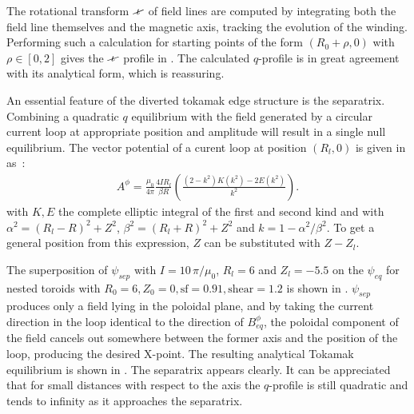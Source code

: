 The rotational transform $\iotaslash$ of field lines are computed by integrating both the field line themselves and the magnetic axis, tracking the evolution of the winding. Performing such a calculation for starting points of the form $(R_0+\rho,0)$ with $\rho\in [0, 2]$ gives the $\iotaslash$ profile in . The calculated $q$-profile is in great agreement with its analytical form, which is reassuring.

An essential feature of the diverted tokamak edge structure is the separatrix. Combining a quadratic $q$ equilibrium with the field generated by a circular current loop at appropriate position and amplitude will result in a single null equilibrium. The vector potential of a curent loop at position $(R_l, 0)$ is given in \cite{simpson_simple_2001} as~:
\begin{align*}
    A^\phi = \frac{\mu_0}{4\pi}\frac{4IR_l}{\beta R}\left(\frac{(2-k^2)K(k^2)-2E(k^2)}{k^2}\right).
\end{align*}
with $K, E$ the complete elliptic integral of the first and second kind and with $\alpha^2 = (R_l-R)^2 + Z^2$, $\beta^2 = (R_l+R)^2+Z^2$ and $k = 1 - \alpha^2/\beta^2$. To get a general position from this expression, $Z$ can be substituted  with $Z-Z_l$.

The superposition of $\psi_{sep}$ with $I = 10\,\pi/\mu_0$, $R_l = 6$ and $Z_l = -5.5$ on the $\psi_{eq}$ for nested toroids with $R_0 = 6, Z_0 = 0, \text{sf} = 0.91, \text{shear} = 1.2$ is shown in . $\psi_{sep}$ produces only a field lying in the poloidal plane, and by taking the current direction in the loop identical to the direction of $B^\phi_{eq}$, the poloidal component of the field cancels out somewhere between the former axis and the position of the loop, producing the desired X-point. The resulting analytical Tokamak equilibrium is shown in . The separatrix appears clearly. It can be appreciated that for small distances with respect to the axis the $q$-profile is still quadratic  and tends to infinity as it approaches the separatrix.

